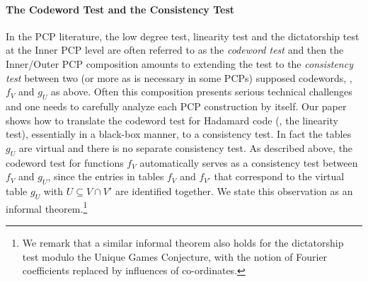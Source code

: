 \paragraph{The Codeword Test and the Consistency Test} In the PCP
literature, the low degree test, linearity test and the dictatorship test at the
Inner PCP level
are
often referred to as the \emph{codeword test} and then the Inner/Outer PCP composition
amounts to extending the test to the \emph{consistency test}
between two (or more as is necessary in some PCPs)
supposed codewords, \eg, $f_V$ and $g_U$ as above. Often this composition
presents serious technical challenges and one needs to carefully analyze
each PCP construction by itself. Our paper shows how to translate
the codeword test for Hadamard code (\ie, the linearity test), essentially in a
black-box manner, to a consistency test. In fact the tables $g_U$ are
virtual and there is no separate
consistency test. As described above, the codeword test for functions $f_V$
automatically serves as a consistency test between $f_V$ and $g_U$, since the
entries in tables
$f_V$ and  $f_{V'}$ that correspond to
the virtual table $g_U$ with $U \subseteq V \cap V'$
are identified together. We state this observation as an informal theorem.\footnote{We remark that a similar informal theorem also holds for the dictatorship test
modulo the Unique Games Conjecture, with the notion of Fourier coefficients replaced
by influences of co-ordinates.}
